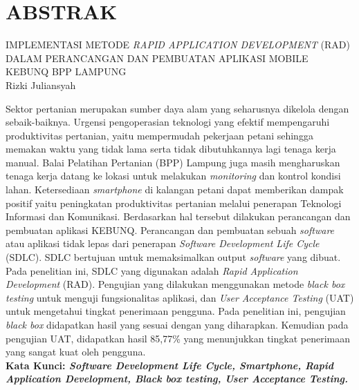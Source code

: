 
\chapter*{ABSTRAK}
\noindent IMPLEMENTASI METODE \textit{RAPID APPLICATION DEVELOPMENT} (RAD) DALAM PERANCANGAN DAN PEMBUATAN APLIKASI MOBILE KEBUNQ BPP LAMPUNG\\
Rizki Juliansyah

\begin{singlespace}
    \begin{justify}
        
    Sektor pertanian merupakan sumber daya alam yang seharusnya dikelola dengan sebaik-baiknya. Urgensi pengoperasian teknologi yang efektif mempengaruhi produktivitas 
    pertanian, yaitu mempermudah pekerjaan petani sehingga memakan waktu yang tidak lama serta tidak dibutuhkannya lagi tenaga kerja manual.
    Balai Pelatihan Pertanian (BPP) Lampung juga masih mengharuskan tenaga kerja datang ke lokasi untuk melakukan \textit{monitoring} 
    dan kontrol kondisi lahan. Ketersediaan \emph{smartphone} di kalangan petani dapat memberikan dampak positif yaitu peningkatan produktivitas pertanian melalui
    penerapan Teknologi Informasi dan Komunikasi. Berdasarkan hal tersebut dilakukan perancangan dan pembuatan aplikasi KEBUNQ. 
    Perancangan dan pembuatan sebuah \emph{software} atau aplikasi tidak lepas dari 
    penerapan \emph{Software Development Life Cycle} (SDLC). SDLC bertujuan untuk memaksimalkan 
    output \emph{software} yang dibuat. Pada penelitian ini, SDLC yang digunakan adalah \emph{Rapid Application Development}
    (RAD). Pengujian yang dilakukan menggunakan metode \emph{black box testing} untuk menguji fungsionalitas aplikasi, dan \emph{User Acceptance Testing} (UAT) untuk mengetahui tingkat penerimaan pengguna. Pada penelitian ini, pengujian \emph{black box} didapatkan hasil yang sesuai dengan yang diharapkan. 
    Kemudian pada pengujian UAT, didapatkan hasil 85,77\% yang menunjukkan tingkat penerimaan yang sangat kuat oleh pengguna.\\[2cm]
        \textbf{Kata Kunci: \textit{Software Development Life Cycle, Smartphone, Rapid Application Development, Black box testing, User Acceptance Testing.}}
    \end{justify}

\end{singlespace}

\newpage